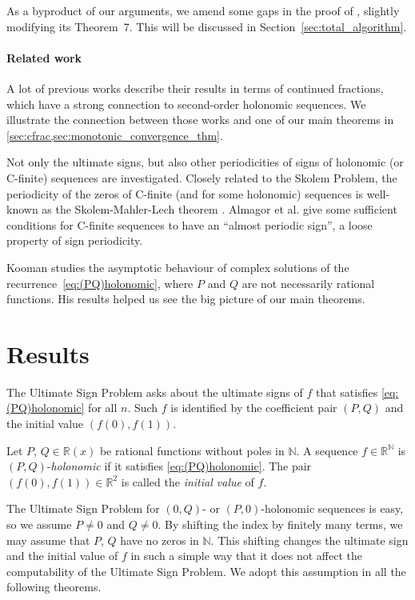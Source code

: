 \documentclass[a4paper,UKenglish,cleveref,autoref,thm-restate]{lipics-v2021}
\newcommand{\R}{\mathbb{R}}
\newcommand{\N}{\mathbb{N}}
\begin{document}
As a byproduct of our arguments, we amend some gaps in the proof of \cite{NOW21}, slightly modifying its Theorem~7. This will be discussed in Section~\ref{sec:total_algorithm}. 

\paragraph*{Related work}

A lot of previous works describe their results in terms of continued fractions, which have a strong connection to second-order holonomic sequences. We illustrate the connection between those works and one of our main theorems in \cref{sec:cfrac,sec:monotonic_convergence_thm}. 

Not only the ultimate signs, but also other periodicities of signs of holonomic (or C-finite) sequences are investigated. Closely related to the Skolem Problem, the periodicity of the zeros of C-finite (and for some holonomic) sequences is well-known as the Skolem-Mahler-Lech theorem \cite{BBY12}. 
Almagor et al. \cite{AKK+21} give some sufficient conditions for C-finite sequences to have an ``almost periodic sign'', a loose property of sign periodicity.

Kooman \cite{Koo07} studies the asymptotic behaviour of complex solutions of the recurrence~\eqref{eq:(PQ)holonomic}, 
where $P$ and $Q$ are not necessarily rational functions. 
His results helped us see the big picture of our main theorems. 


\section{Results}\label{sec:result}

The Ultimate Sign Problem asks about the ultimate signs of $f$ that satisfies \eqref{eq:(PQ)holonomic} for all $n$. Such $f$ is identified by the coefficient pair $(P, Q)$ and the initial value $(f(0), f(1))$. 

\begin{definition}
Let $P$, $Q \in \R(x)$ be rational functions without poles in $\N$. 
A sequence $f \in \R^{\N}$ is $(P, Q)$-\emph{holonomic} 
if it satisfies \eqref{eq:(PQ)holonomic}. 
The pair $(f(0), f(1)) \in \R^2$ is called the \emph{initial value} of $f$. 
\end{definition}

The Ultimate Sign Problem for $(0, Q)$- or $(P, 0)$-holonomic sequences is easy, 
so we assume $P \neq 0$ and $Q \neq 0$. 
By shifting the index by finitely many terms, 
we may assume that $P$, $Q$ have no zeros in $\N$. 
This shifting changes the ultimate sign and the initial value of $f$ in such a simple way that
it does not affect the computability of the Ultimate Sign Problem. 
We adopt this assumption in all the following theorems.
\end{document}
